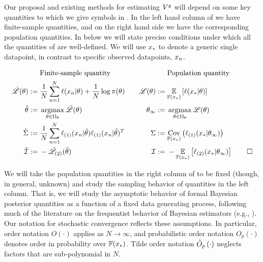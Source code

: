 Our proposal and existing methods for estimating $V^g$ will depend on some key
quantities to which we give symbols in .  In the left hand
column of  we have finite-sample quantities, and on the right
hand side we have the corresponding population quantities. In 
below we will state precise conditions under which all the quantities of
 are well-defined.  We will use $x_{*}$ to denote a generic
single datapoint, in contrast to specific observed datapoints, $x_n$.
%
\begin{defn}
\setlength{\abovedisplayskip}{0pt}
\setlength{\abovedisplayshortskip}{0pt}
\begin{align*}
&\textrm{Finite-sample quantity} && \textrm{Population quantity}\\
%
\likhat(\theta) :={}&
   \frac{1}{N} \sumn \ell(\x_n \vert \theta) +
   \frac{1}{N} \logprior(\theta)
&
\quad \lik(\theta) :={}& \expect{\fdist(\xn)}{\ell(\xn \vert \theta)}
\\
\thetahat :={}& \argmax_{\theta \in \thetadom} \likhat(\theta)
&
\thetatrue :={}& \argmax_{\theta \in \thetadom} \lik(\theta)
\\
\scorecovhat :={}&
   \frac{1}{N} \sumn \ellgrad{1}(\x_n \vert \thetahat)
                     \ellgrad{1}(\x_n \vert \thetahat)^T
&
\scorecov :={}&
    \cov{\fdist(\xn)}{\ellgrad{1}(\xn \vert \thetatrue)}
\\
\infohat :={}& -\likhatk{2}(\thetahat)
&
\info :={}& - \expect{\fdist(\xn)}{\ellgrad{2}(\xn \vert \thetatrue)} \qedhere
%
\end{align*}
\end{defn}
%

We will take the population quantities in the right column of
 to be fixed (though, in general, unknown) and study the
sampling behavior of quantities in the left column. That is, we will study the
asymptotic behavior of formal Bayesian posterior quantities as a function of a
fixed data generating process, following much of the literature on the
frequentist behavior of Bayesian estimators (e.g., \citet{van:2000:asymptotic}).
%
Our notation for stochastic convergence reflects these assumptions.  In
particular, order notation $O(\cdot)$ applies as $N \rightarrow \infty$, and
probabilistic order notation $O_p(\cdot)$ denotes order in probability over
$\mathbb{F}(x_{*})$.  Tilde order notation $\tilde{O}_p\left(\cdot\right)$ neglects factors that are
sub-polynomial in $N$.

